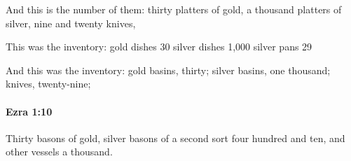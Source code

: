 			\begin{versebox}
					\item[BHS] 
					\item[LXX] 
					\item[ASV] And this is the number of them: thirty platters of gold, a thousand platters of silver, nine and twenty knives,
					\item[NIV] This was the inventory: gold dishes 30 silver dishes 1,000 silver pans 29
					\item[NRSV] And this was the inventory: gold basins, thirty; silver basins, one thousand; knives, twenty-nine;
			\end{versebox}

		\paragraph{Ezra 1:10} %
			\label{EZRA-1-10}

			Thirty basons of gold, silver basons of a second sort four hundred and ten, and other vessels a thousand.

